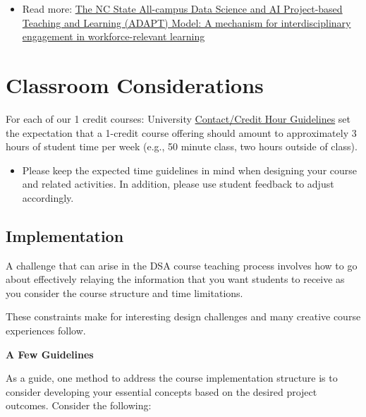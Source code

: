 \documentclass[
  letterpaper,
  DIV=11,
  numbers=noendperiod]{scrreprt}
\providecommand{\tightlist}{%
  \setlength{\itemsep}{0pt}\setlength{\parskip}{0pt}}
\begin{document}
\begin{itemize}
\tightlist
\item
  Read more: \href{https://arxiv.org/abs/2604.02597}{The NC State
  All-campus Data Science and AI Project-based Teaching and Learning
  (ADAPT) Model: A mechanism for interdisciplinary engagement in
  workforce-relevant learning}
\end{itemize}

\section{Classroom Considerations}\label{classroom-considerations}

For each of our 1 credit courses: University
\href{https://oucc.dasa.ncsu.edu/courses/contact-credit-hours/}{Contact/Credit
Hour Guidelines} set the expectation that a 1-credit course offering
should amount to approximately 3 hours of student time per week (e.g.,
50 minute class, two hours outside of class).

\begin{itemize}
\tightlist
\item
  Please keep the expected time guidelines in mind when designing your
  course and related activities. In addition, please use student
  feedback to adjust accordingly.
\end{itemize}

\subsection{Implementation}\label{implementation}

A challenge that can arise in the DSA course teaching process involves
how to go about effectively relaying the information that you want
students to receive as you consider the course structure and time
limitations.

These constraints make for interesting design challenges and many
creative course experiences follow.

\textbf{A Few Guidelines}

As a guide, one method to address the course implementation structure is
to consider developing your essential concepts based on the desired
project outcomes. Consider the following:
\end{document}
